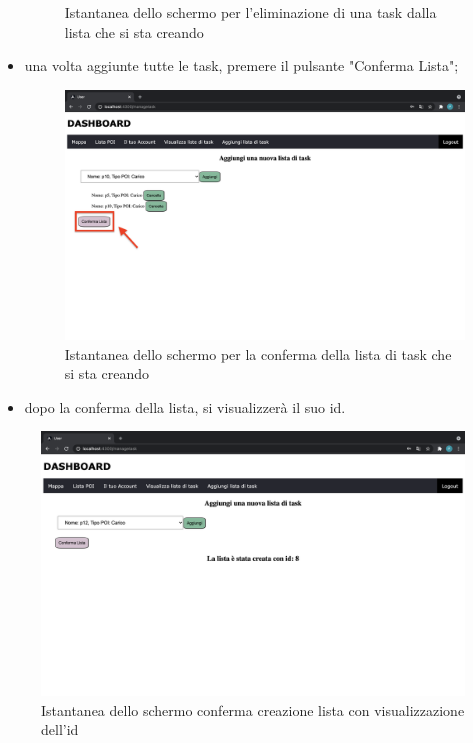 \begin{itemize}
\begin{figure}[H]
        \caption{Istantanea dello schermo per l'eliminazione di una task dalla lista che si sta creando}
    \end{figure}
    \item una volta aggiunte tutte le task, premere il pulsante "Conferma Lista";
    \begin{figure}[H]
        \centering
        \includegraphics[scale=0.12]{res/images/confermalista.png}
        \caption{Istantanea dello schermo per la conferma della lista di task che si sta creando}
    \end{figure}
    \item dopo la conferma della lista, si visualizzerà il suo id.
    
\end{itemize}
\begin{figure}[H]
    \centering
    \includegraphics[scale=0.2]{res/images/listacreata.png}
    \caption{Istantanea dello schermo conferma creazione lista con visualizzazione dell'id}
\end{figure}
